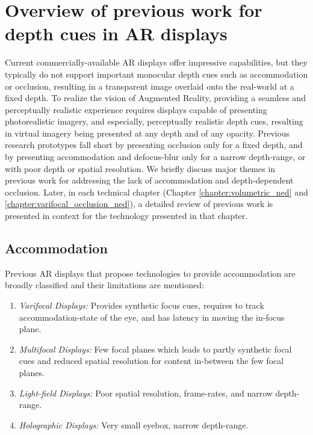 \section{Overview of previous work for depth cues in AR displays}
\label{sec:background:previous_work_ar}
Current commercially-available AR displays offer impressive capabilities, but they typically do not support important monocular depth cues such as accommodation or occlusion, resulting in a transparent image overlaid onto the real-world at a fixed depth. 
To realize the vision of Augmented Reality, providing a seamless and perceptually realistic experience requires displays capable of presenting photorealistic imagery, and especially, perceptually realistic depth cues, resulting in virtual imagery being presented at any depth and of any opacity. 
Previous research prototypes fall short by presenting occlusion only for a fixed depth, and by presenting accommodation and defocus-blur only for a narrow depth-range, or with poor depth or spatial resolution. 
We briefly discuss major themes in previous work for addressing the lack of accommodation and depth-dependent occlusion. 
Later, in each technical chapter (Chapter \ref{chapter:volumetric_ned} and \ref{chapter:varifocal_occlusion_ned}), a detailed review of previous work is presented in context for the technology presented in that chapter.

\subsection{Accommodation}

Previous AR displays that propose technologies to provide accommodation are broadly classified and their limitations are mentioned:

\begin{enumerate}
    \item \emph{Varifocal Displays:} \cite{Dunn2017Wide,Aksit2017Near} Provides synthetic focus cues, requires to track accommodation-state of the eye, and has latency in moving the in-focus plane.
    \item \emph{Multifocal Displays:} \cite{Akeley2004,Narain2015optimal} Few focal planes which leads to partly synthetic focal cues and reduced spatial resolution for content in-between the few focal planes.
    \item \emph{Light-field Displays:} \cite{Maimone2014Pinlight} Poor spatial resolution, frame-rates, and narrow depth-range. 
    \item \emph{Holographic Displays:} \cite{Maimone2017Holographic} Very small eyebox, narrow depth-range.
\end{enumerate}

